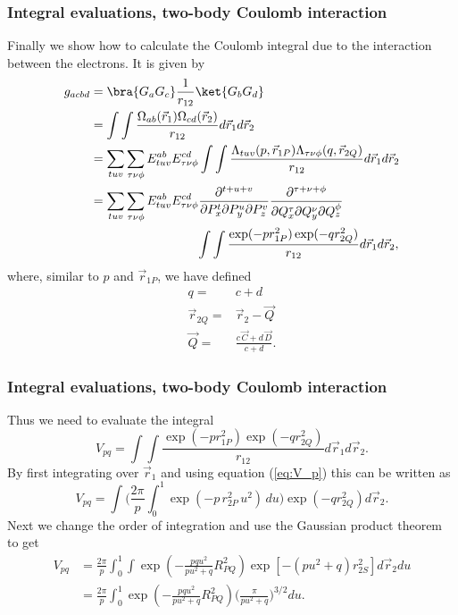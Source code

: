 \frame
{
  \frametitle{Integral evaluations, two-body Coulomb interaction}
\begin{small}
{\scriptsize
Finally we show how to calculate the Coulomb integral due to the interaction between the electrons. It is given by
\begin{equation}
\begin{split}
  g_{acbd} & = \bra{G_a G_c}\frac{1}{r_{12}}\ket{G_b G_d} \\
           & = \int\int \frac{\Omega_{ab}(\vec r_1)\Omega_{cd}(\vec r_2)}{r_{12}} d\vec r_1 d\vec r_2 \\
           & = \sum_{tuv}\sum_{\tau\nu\phi}E^{ab}_{tuv}E^{cd}_{\tau\nu\phi}\int\int\frac{\Lambda_{tuv}(p,\vec r_{1P})\Lambda_{\tau\nu\phi}(q,\vec r_{2Q})}{r_{12}}d \vec r_1 d\vec r_2 \\
           & = \sum_{tuv}\sum_{\tau\nu\phi}E^{ab}_{tuv}E^{cd}_{\tau\nu\phi}\frac{\partial^{t+u+v}}{\partial P_x^t \partial P_y^u \partial P_z^v}
                \frac{\partial^{\tau+\nu+\phi}}{\partial Q_x^\tau \partial Q_y^\nu \partial Q_z^\phi} \\
           &    \hspace{30mm} \int\int\frac{\exp(-pr^2_{1P})\exp(-qr^2_{2Q})}{r_{12}}d \vec r_1 d\vec r_2,
\end{split}
\end{equation}
where, similar to $p$ and $\vec r_{1P}$, we have defined 
\begin{equation}
 \begin{split}
    q = & c + d\\
  \vec r_{2Q} = & \vec r_2 - \vec Q \\
  \vec Q = & \frac{c\,\vec C + d\,\vec D}{c + d}.
 \end{split}
\end{equation}
}
\end{small}
}
\frame
{
  \frametitle{Integral evaluations, two-body Coulomb interaction}
\begin{small}
{\scriptsize
Thus we need to evaluate the integral
\begin{equation}
 V_{pq} = \int\int\frac{\exp(-pr^2_{1P})\exp(-qr^2_{2Q})}{r_{12}}d \vec r_1 d\vec r_2.
\end{equation}
By first integrating over $\vec r_1$ and using equation (\ref{eq:V_p}) this can be written as
\begin{equation}
 V_{pq} = \int\Big(\frac{2\pi}{p}\int_0^1\exp(-p\,r^2_{2P}\,u^2)\,du\Big)\exp(-qr^2_{2Q}) d \vec r_2.
\end{equation}
Next we change the order of integration and use the Gaussian product theorem to get
\begin{equation}
\begin{split}
 V_{pq} & = \frac{2\pi}{p}\int_0^1\int\exp(-\frac{pqu^2}{pu^2+q}R^2_{PQ})\exp[-(pu^2+q)r_{2S}^2] d\vec r_2 du \\
        & = \frac{2\pi}{p}\int_0^1\exp(-\frac{pqu^2}{pu^2+q}R^2_{PQ})\Big(\frac{\pi}{pu^2+q}\Big)^{3/2} du.
\end{split}
\end{equation}
}
\end{small}
}
